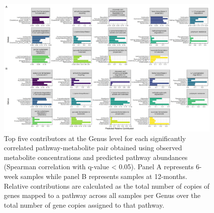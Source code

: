 \begin{figure}[!h]
    \centering
    \includegraphics[width=0.95\linewidth]{figures/appB_fs10.png}
    \caption[Top five contributors at the Genus level for each significantly correlated pathway-metabolite pair obtained using observed metabolite concentrations and predicted pathway abundances (Spearman correlation with q-value $<$ 0.05)]{Top five contributors at the Genus level for each significantly correlated pathway-metabolite pair obtained using observed metabolite concentrations and predicted pathway abundances (Spearman correlation with q-value < 0.05). Panel A represents 6-week samples while panel B represents samples at 12-months. Relative contributions are calculated as the total number of copies of genes mapped to a pathway across all samples per Genus over the total number of gene copies assigned to that pathway.}
    \label{fig:b10}
\end{figure}

